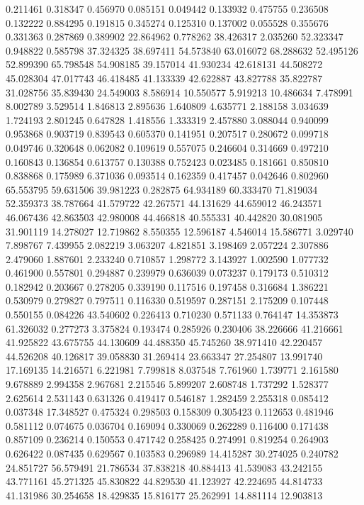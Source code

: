 0.211461
0.318347
0.456970
0.085151
0.049442
0.133932
0.475755
0.236508
0.132222
0.884295
0.191815
0.345274
0.125310
0.137002
0.055528
0.355676
0.331363
0.287869
0.389902
22.864962
0.778262
38.426317
2.035260
52.323347
0.948822
0.585798
37.324325
38.697411
54.573840
63.016072
68.288632
52.495126
52.899390
65.798548
54.908185
39.157014
41.930234
42.618131
44.508272
45.028304
47.017743
46.418485
41.133339
42.622887
43.827788
35.822787
31.028756
35.839430
24.549003
8.586914
10.550577
5.919213
10.486634
7.478991
8.002789
3.529514
1.846813
2.895636
1.640809
4.635771
2.188158
3.034639
1.724193
2.801245
0.647828
1.418556
1.333319
2.457880
3.088044
0.940099
0.953868
0.903719
0.839543
0.605370
0.141951
0.207517
0.280672
0.099718
0.049746
0.320648
0.062082
0.109619
0.557075
0.246604
0.314669
0.497210
0.160843
0.136854
0.613757
0.130388
0.752423
0.023485
0.181661
0.850810
0.838868
0.175989
6.371036
0.093514
0.162359
0.417457
0.042646
0.802960
65.553795
59.631506
39.981223
0.282875
64.934189
60.333470
71.819034
52.359373
38.787664
41.579722
42.267571
44.131629
44.659012
46.243571
46.067436
42.863503
42.980008
44.466818
40.555331
40.442820
30.081905
31.901119
14.278027
12.719862
8.550355
12.596187
4.546014
15.586771
3.029740
7.898767
7.439955
2.082219
3.063207
4.821851
3.198469
2.057224
2.307886
2.479060
1.887601
2.233240
0.710857
1.298772
3.143927
1.002590
1.077732
0.461900
0.557801
0.294887
0.239979
0.636039
0.073237
0.179173
0.510312
0.182942
0.203667
0.278205
0.339190
0.117516
0.197458
0.316684
1.386221
0.530979
0.279827
0.797511
0.116330
0.519597
0.287151
2.175209
0.107448
0.550155
0.084226
43.540602
0.226413
0.710230
0.571133
0.764147
14.353873
61.326032
0.277273
3.375824
0.193474
0.285926
0.230406
38.226666
41.216661
41.925822
43.675755
44.130609
44.488350
45.745260
38.971410
42.220457
44.526208
40.126817
39.058830
31.269414
23.663347
27.254807
13.991740
17.169135
14.216571
6.221981
7.799818
8.037548
7.761960
1.739771
2.161580
9.678889
2.994358
2.967681
2.215546
5.899207
2.608748
1.737292
1.528377
2.625614
2.531143
0.631326
0.419417
0.546187
1.282459
2.255318
0.085412
0.037348
17.348527
0.475324
0.298503
0.158309
0.305423
0.112653
0.481946
0.581112
0.074675
0.036704
0.169094
0.330069
0.262289
0.116400
0.171438
0.857109
0.236214
0.150553
0.471742
0.258425
0.274991
0.819254
0.264903
0.626422
0.087435
0.629567
0.103583
0.296989
14.415287
30.274025
0.240782
24.851727
56.579491
21.786534
37.838218
40.884413
41.539083
43.242155
43.771161
45.271325
45.830822
44.829530
41.123927
42.224695
44.814733
41.131986
30.254658
18.429835
15.816177
25.262991
14.881114
12.903813
